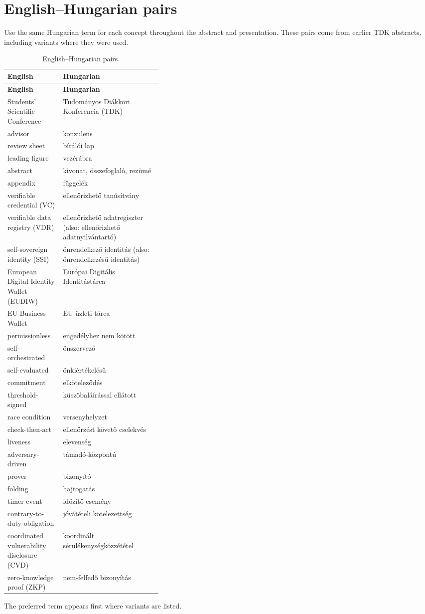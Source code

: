 \section{English--Hungarian pairs}
Use the same Hungarian term for each concept throughout the abstract and presentation. These pairs come from earlier TDK abstracts, including variants where they were used.
{\small
\begin{xltabular}{\linewidth}{>{\raggedright\arraybackslash}p{0.36\linewidth} >{\raggedright\arraybackslash}X}
  \caption{English--Hungarian pairs.}\label{tab:glossary-hu}\\
  \toprule \textbf{English} & \textbf{Hungarian} \\ \midrule \endfirsthead
  \toprule \textbf{English} & \textbf{Hungarian} \\ \midrule \endhead
  \bottomrule \endlastfoot
  Students' Scientific Conference & Tudományos Diákköri Konferencia (TDK) \\
  advisor & konzulens \\
  review sheet & bírálói lap \\
  leading figure & vezérábra \\
  abstract & kivonat, összefoglaló, rezümé \\
  appendix & függelék \\
  verifiable credential (VC) & ellenőrizhető tanúsítvány \\
  verifiable data registry (VDR) & ellenőrizhető adatregiszter (also: ellenőrizhető adatnyilvántartó) \\
  self-sovereign identity (SSI) & önrendelkező identitás (also: önrendelkezésű identitás) \\
  European Digital Identity Wallet (EUDIW) & Európai Digitális Identitástárca \\
  EU Business Wallet & EU üzleti tárca \\
  permissionless & engedélyhez nem kötött \\
  self-orchestrated & önszervező \\
  self-evaluated & önkiértékelésű \\
  commitment & elköteleződés \\
  threshold-signed & küszöbaláírással ellátott \\
  race condition & versenyhelyzet \\
  check-then-act & ellenőrzést követő cselekvés \\
  liveness & elevenség \\
  adversary-driven & támadó-központú \\
  prover & bizonyító \\
  folding & hajtogatás \\
  timer event & időzítő esemény \\
  contrary-to-duty obligation & jóvátételi kötelezettség \\
  coordinated vulnerability disclosure (CVD) & koordinált sérülékenységközzététel \\
  zero-knowledge proof (ZKP) & nem-felfedő bizonyítás \\
\end{xltabular}
}
The preferred term appears first where variants are listed.
